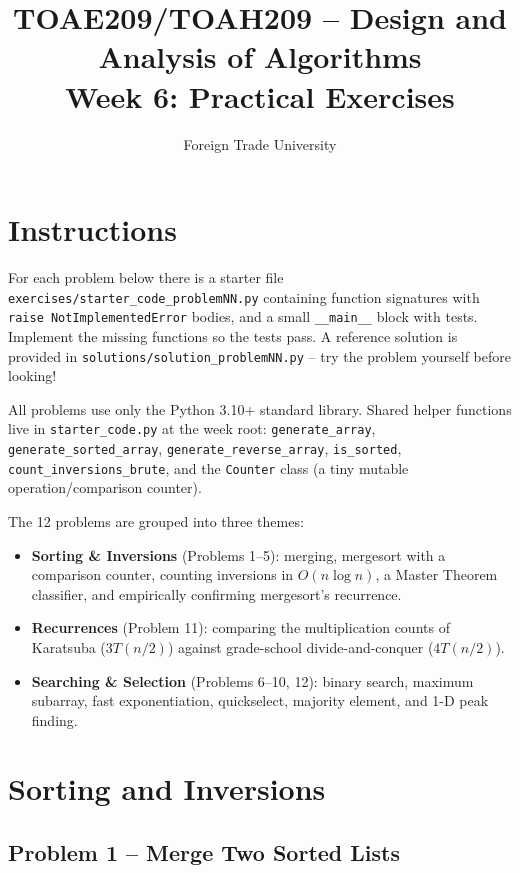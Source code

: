 \documentclass[11pt]{article}
\title{TOAE209/TOAH209 -- Design and Analysis of Algorithms\\[4pt]
\large Week 6: Practical Exercises}
\author{Foreign Trade University}
\date{}
\begin{document}
\maketitle

\section*{Instructions}

For each problem below there is a starter file
\texttt{exercises/starter\_code\_problemNN.py} containing function signatures with
\texttt{raise NotImplementedError} bodies, and a small \texttt{\_\_main\_\_} block with
tests. Implement the missing functions so the tests pass. A reference solution is
provided in \texttt{solutions/solution\_problemNN.py} -- try the problem yourself before
looking!

All problems use only the Python 3.10+ standard library. Shared helper functions live in
\texttt{starter\_code.py} at the week root: \texttt{generate\_array},
\texttt{generate\_sorted\_array}, \texttt{generate\_reverse\_array}, \texttt{is\_sorted},
\texttt{count\_inversions\_brute}, and the \texttt{Counter} class (a tiny mutable
operation/comparison counter).

The 12 problems are grouped into three themes:
\begin{itemize}
    \item \textbf{Sorting \& Inversions} (Problems 1--5): merging, mergesort with a
    comparison counter, counting inversions in $O(n \log n)$, a Master Theorem classifier,
    and empirically confirming mergesort's recurrence.
    \item \textbf{Recurrences} (Problem 11): comparing the multiplication counts of
    Karatsuba ($3T(n/2)$) against grade-school divide-and-conquer ($4T(n/2)$).
    \item \textbf{Searching \& Selection} (Problems 6--10, 12): binary search, maximum
    subarray, fast exponentiation, quickselect, majority element, and 1-D peak finding.
\end{itemize}

\newpage
\section{Sorting and Inversions}

\subsection*{Problem 1 -- Merge Two Sorted Lists}
\end{document}
